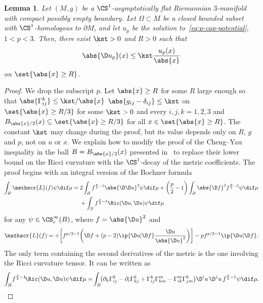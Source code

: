 \documentclass[10pt,a4paper]{amsart}
\numberwithin{equation}{section}
\newtheorem{Lemma}[Theorem]{Lemma}
\newcommand{\lop}{\mathscr{L}}
\begin{document}
\begin{Lemma}\label{prop:gradientdecay}
 Let $(M, g)$ be a $\CS^1$-asymptotically flat Riemannian $3$-manifold with compact possibly empty boundary. Let $\Omega \subset M$ be a closed bounded subset with $\CS^1$-homologous to $\partial M$, and let $u_p$ be the solution to~\eqref{eq:p-cap-potential}, $1< p < 3$. Then, there exist $\kst >0$ and $R>0$ such that
 \begin{equation}
\label{eq:gradientdecay}
\abs{\D u_p}(x) \leq \kst\frac{u_p(x)}{\abs{x}}
 \end{equation}
 on $\set{\abs{x} \geq R}$.
\end{Lemma}
\begin{proof} We drop the subscript $p$. Let $\abs{x} \geq R$ for some $R$ large enough so that $\abs{\Gamma^k_{ij}} \leq {\kst}/\abs{x}$ $ \abs{g_{ij}-\delta_{ij}}\leq \kst$ on $\set{\abs{x} \geq R/3}$ for some $\kst>0$ and every $i,j,k=1,2,3$ and $B_{\abs{x}/2}(x) \subseteq\set{\abs{x} \geq R/3}$ for all $x \in \set{\abs{x} \geq R}$. The constant $\kst$ may change during the proof, but its value depends only on $R$, $g$ and $p$, not on $u$ or $x$. We explain how to modify the proof of the Cheng--Yau inequality in the ball $B=B_{\abs{x}/2}(x)$ presented in~\cite{wang_localgradientestimateharmonic_2010} to replace their lower bound on the Ricci curvature with the $\CS^1$-decay of the metric coefficients. The proof begins with an integral version of the Bochner formula
\begin{align}
\int_{B} \lop (f) \psi \dif\mu ={}& 2 \int_{B} f^{\frac{p}{2} - 1} \abs{\D\D u}^2 \psi \dif\mu + \bigg(\frac{p}{2} -1\bigg)\int_{B}\abs{\D f}^2 f^{\frac{p}{2} - 2} \psi \dif \mu \nonumber \\
&{}+\int_{B}f^{\frac{p}{2} - 1} \Ric(\D u, \D u) \psi \dif\mu \label{eq:primopassaggioyau}
\end{align}
for any $\psi \in \CS^\infty_c (B)$, where $f=\abs{\D u}^2$ and
\[
 \lop(f) = \div \bigg[ f^{p/2-1} \bigg( \D f + (p-2) \ip{\D u| \D f}\frac{ \D u }{\abs{ \D u }^2} \bigg) \bigg] - p f^{p/2-1} \ip{ \D u | \D f}.
\]
The only term containing the second derivatives of the metric is the one involving the Ricci curvature tensor. It can be written as
\begin{align}\label{eq:cheng-yau_Ricci_step1}
 \int_{B}\!f^{\frac{p}{2} - 1}\!\Ric(\D u, \D u) \psi \dif\mu = \! \int_{B} \!\! \big(\partial_k \Gamma^k_{ij} - \partial_i \Gamma^k_{kj} + \Gamma^k_{ij}\Gamma^m_{km} - \Gamma^m_{ik} \Gamma^k_{jm}\big)\D^i u\,\D^ju\, f^{\frac{p}{2} - 1}\psi \dif\mu. \!

\end{align}
\end{proof}
\end{document}
